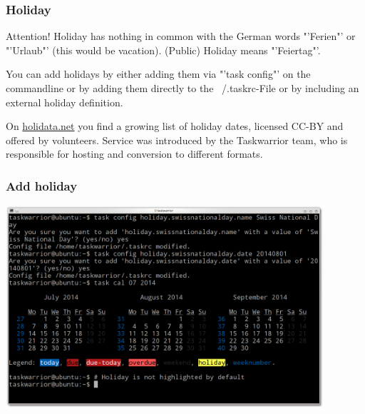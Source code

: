\documentclass[t,handout]{beamer}
\begin{document}
\begin{frame}\frametitle{Holiday}
\begin{alertblock}{Attention!}
Holiday has nothing in common with the German words "'Ferien"' or "'Urlaub"' (this would be vacation). (Public) Holiday means "'Feiertag"'.
\end{alertblock}

You can add holidays by either adding them via "'task config"' on the commandline or by adding them directly to the ~/.taskrc-File or by including an external holiday definition.

On \href{http://holidata.net/}{holidata.net} you find a growing list of holiday dates, licensed CC-BY and offered by volunteers. Service was introduced by the Taskwarrior team, who is responsible for hosting and conversion to different formats.
\end{frame}

\begin{frame}[fragile]\frametitle{Add holiday}
\begin{center} %
\includegraphics[width=11.8cm,height=7.5cm]{add-holiday.png}
\end{center}
\end{frame}
\end{document}
